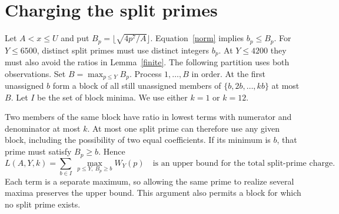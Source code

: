 \documentclass[11pt]{article}
\begin{document}
\newpage
\section{Charging the split primes}
Let $A<x\le U$ and put $B_p=\lfloor\sqrt{4p^7/A}\rfloor$.
Equation~\eqref{norm} implies $b_p\le B_p$. For $Y\le6500$, distinct
split primes must use distinct integers $b_p$. At $Y\le4200$ they must
also avoid the ratios in Lemma~\ref{finite}. The following partition uses
both observations. Set $B=\max_{p\le Y} B_p$. Process $1,\ldots,B$ in
order. At the first unassigned $b$ form a block of all still unassigned
members of $\{b,2b,\ldots,kb\}$ at most $B$. Let $I$ be the set of block
minima. We use either $k=1$ or $k=12$.

Two members of the same block have ratio in lowest terms with numerator
and denominator at most $k$. At most one split prime can therefore use
any given block, including the possibility of two equal coefficients.
If its minimum is $b$, that prime must satisfy $B_p\ge b$. Hence
\begin{equation}\label{pack}
 L(A,Y,k)=\sum_{b\in I}\ \max_{p\le Y,\ B_p\ge b}W_Y(p)
 \quad\text{is an upper bound for the total split-prime charge.}
\end{equation}
Each term is a separate maximum, so allowing the same prime to realize
several maxima preserves the upper bound. This argument also permits a
block for which no split prime exists.
\end{document}
